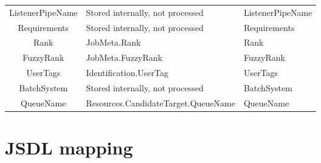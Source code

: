 \documentclass{article}
\newcommand{\NST}[1]{\normalsize{\textnormal{#1}}}
\begin{document}
\begin{center}
\begin{tabularx}{\textwidth}{CTT}
ListenerPipeName & \NST{Stored internally, not processed} & ListenerPipeName\\
Requirements & \NST{Stored internally, not processed} & Requirements\\
Rank & JobMeta.Rank & Rank\\
FuzzyRank & JobMeta.FuzzyRank & FuzzyRank\\
UserTags & Identification.UserTag & UserTags\\
BatchSystem & \NST{Stored internally, not processed} & BatchSystem\\
QueueName & Resources.CandidateTarget.QueueName & QueueName
\end{tabularx}
\end{center}

\section{JSDL mapping}
\end{document}
